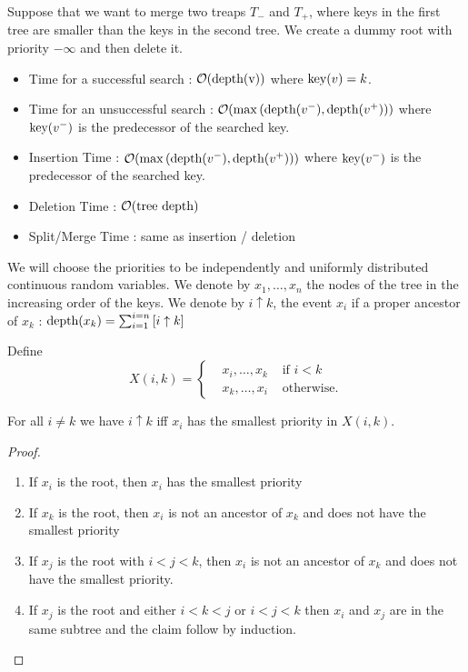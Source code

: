 \documentclass{cours}
\begin{document}
\begin{proposition}[Merge]
    Suppose that we want to merge two treaps $T_{-}$ and $T_{+}$, where keys in the first tree are smaller than the keys in the second tree. We create a dummy root with priority $-\infty$ and then delete it. 
\end{proposition}

\begin{proposition}[Complexity]
    \begin{itemize}
        \item Time for a successful search : $\mathcal{O}(\textmd{depth(v)})$ where $\textmd{key}(v) = k$.
        \item Time for an unsuccessful search : $\mathcal{O}(\max \left(\textmd{depth}(v^{-}), \textmd{depth}(v^{+})\right))$ where $\textmd{key}(v^{-})$ is the predecessor of the searched key.
        \item Insertion Time : $\mathcal{O}(\max \left(\textmd{depth}(v^{-}), \textmd{depth}(v^{+})\right))$ where $\textmd{key}(v^{-})$ is the predecessor of the searched key.
        \item Deletion Time : $\mathcal{O}(\text{tree depth})$
        \item Split/Merge Time : same as insertion / deletion
    \end{itemize}
\end{proposition}

We will choose the priorities to be independently and uniformly distributed continuous random variables. We denote by $x_{1}, \ldots, x_{n}$ the nodes of the tree in the increasing order of the keys.
We denote  by $i \uparrow k$, the event $x_{i}$ if a proper ancestor of $x_{k}$ : $\textmd{depth}(x_{k}) = \sum_{i = 1}^{i = n} \left[i \uparrow k\right]$

\begin{lemma}
    Define \[
        X(i, k) = \left\{\begin{aligned} &x_{i},\ldots, x_{k} &\text{ if } i < k \\
            & x_{k},\ldots, x_{i} & \text{ otherwise}.
        \end{aligned}\right.\]

    For all $i \neq k$ we have $i \uparrow k$ iff $x_{i}$ has the smallest priority in $X(i, k)$.
\end{lemma}
\begin{proof}
    \begin{enumerate}
        \item If $x_{i}$ is the root, then $x_{i}$ has the smallest priority
        \item If $x_{k}$ is the root, then $x_{i}$ is not an ancestor of $x_{k}$ and does not have the smallest priority
        \item If $x_{j}$ is the root with $i < j < k$, then $x_{i}$ is not an ancestor of $x_{k}$ and does not have the smallest priority.
        \item If $x_{j}$ is the root and either $i < k < j$ or $i < j < k$ then $x_{i}$ and $x_{j}$ are in the same subtree and the claim follow by induction.
    \end{enumerate}
\end{proof}
\end{document}
